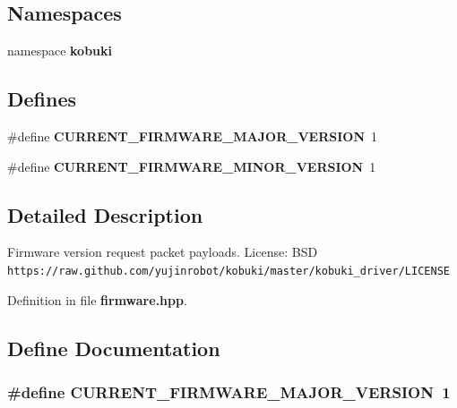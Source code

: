 \subsection*{\-Namespaces}
\begin{DoxyCompactItemize}
\item 
namespace {\bf kobuki}
\end{DoxyCompactItemize}
\subsection*{\-Defines}
\begin{DoxyCompactItemize}
\item 
\#define {\bf \-C\-U\-R\-R\-E\-N\-T\-\_\-\-F\-I\-R\-M\-W\-A\-R\-E\-\_\-\-M\-A\-J\-O\-R\-\_\-\-V\-E\-R\-S\-I\-O\-N}~1
\item 
\#define {\bf \-C\-U\-R\-R\-E\-N\-T\-\_\-\-F\-I\-R\-M\-W\-A\-R\-E\-\_\-\-M\-I\-N\-O\-R\-\_\-\-V\-E\-R\-S\-I\-O\-N}~1
\end{DoxyCompactItemize}


\subsection{\-Detailed \-Description}
\-Firmware version request packet payloads. \-License\-: \-B\-S\-D {\tt https\-://raw.\-github.\-com/yujinrobot/kobuki/master/kobuki\-\_\-driver/\-L\-I\-C\-E\-N\-S\-E} 

\-Definition in file {\bf firmware.\-hpp}.



\subsection{\-Define \-Documentation}
\subsubsection[{\-C\-U\-R\-R\-E\-N\-T\-\_\-\-F\-I\-R\-M\-W\-A\-R\-E\-\_\-\-M\-A\-J\-O\-R\-\_\-\-V\-E\-R\-S\-I\-O\-N}]{\setlength{\rightskip}{0pt plus 5cm}\#define {\bf \-C\-U\-R\-R\-E\-N\-T\-\_\-\-F\-I\-R\-M\-W\-A\-R\-E\-\_\-\-M\-A\-J\-O\-R\-\_\-\-V\-E\-R\-S\-I\-O\-N}~1}\label{firmware_8hpp_a161d3871c6e5e161eb3065ca8d8e5669}


